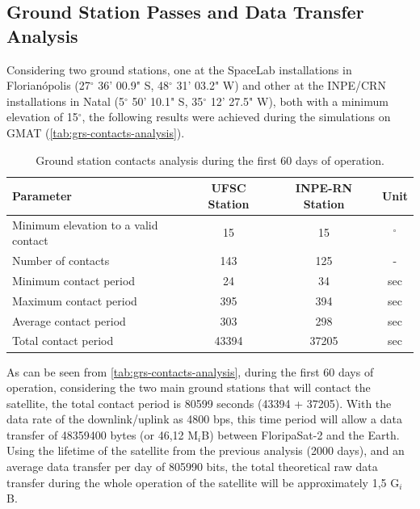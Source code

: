 \subsection{Ground Station Passes and Data Transfer Analysis}

Considering two ground stations, one at the SpaceLab installations in Florianópolis (27$^{\circ}$ 36' 00.9" S, 48$^{\circ}$ 31' 03.2" W) and other at the INPE/CRN installations in Natal (5$^{\circ}$ 50' 10.1" S, 35$^{\circ}$ 12' 27.5" W), both with a minimum elevation of 15$^{\circ}$, the following results were achieved during the simulations on GMAT (\autoref{tab:grs-contacts-analysis}).

\begin{table}[!h]
    \centering
    \begin{tabular}{lccc}
        \toprule[1.5pt]
        \textbf{Parameter} & \textbf{UFSC Station} & \textbf{INPE-RN Station} & \textbf{Unit} \\
        \midrule
        Minimum elevation to a valid contact    & 15    & 15    & $^{\circ}$ \\
        Number of contacts                      & 143   & 125   & - \\
        Minimum contact period                  & 24    & 34    & sec \\
        Maximum contact period                  & 395   & 394   & sec \\
        Average contact period                  & 303   & 298   & sec \\
        Total contact period                    & 43394 & 37205 & sec \\
        \bottomrule[1.5pt]
    \end{tabular}
    \caption{Ground station contacts analysis during the first 60 days of operation.}
    \label{tab:grs-contacts-analysis}
\end{table}

As can be seen from \autoref{tab:grs-contacts-analysis}, during the first 60 days of operation, considering the two main ground stations that will contact the satellite, the total contact period is 80599 seconds (43394 + 37205). With the data rate of the downlink/uplink as 4800 bps, this time period will allow a data transfer of 48359400 bytes (or 46,12 M$_{i}$B) between FloripaSat-2 and the Earth. Using the lifetime of the satellite from the previous analysis (2000 days), and an average data transfer per day of 805990 bits, the total theoretical raw data transfer during the whole operation of the satellite will be approximately 1,5 G$_{i}$B.

